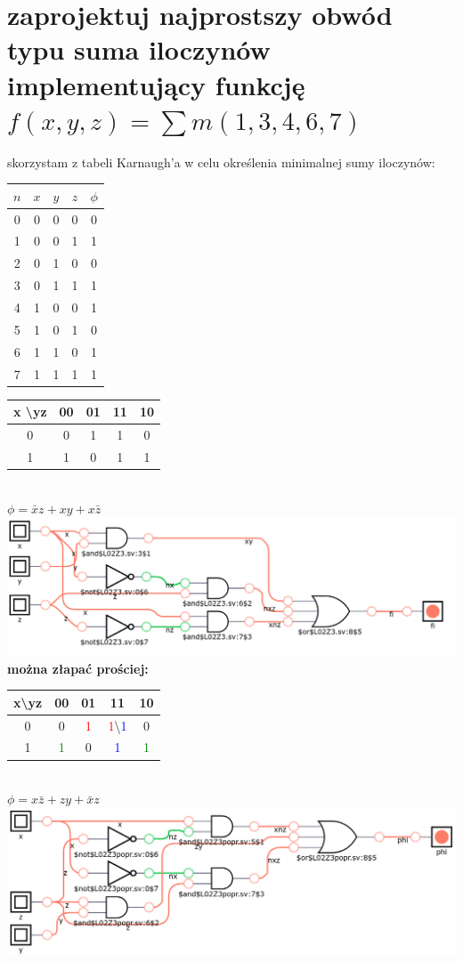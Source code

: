 \documentclass{article}
\begin{document}
 \section{zaprojektuj najprostszy obwód typu suma iloczynów implementujący funkcję $f (x, y, z) = \sum m(1, 3, 4, 6, 7)$}
 skorzystam z tabeli Karnaugh'a w celu określenia minimalnej sumy iloczynów:
 \begin{center}
	\begin{tabular}{|c||c|c|c||c|} 
	 \hline
	$n$ & $x$ & $y$ & $z$ & $\phi$\\ 
	 \hline \hline
	 0&0&0&0&0\\ \hline
	 1&0&0&1&1\\ \hline
	 2&0&1&0&0\\ \hline
	 3&0&1&1&1\\ \hline
	 4&1&0&0&1\\ \hline	 
	 5&1&0&1&0\\ \hline
	 6&1&1&0&1\\ \hline
	 7&1&1&1&1\\ \hline
	\end{tabular}
	\begin{tabular}{|c|c|c|c|c|} 
	 \hline
	x \textbackslash yz& 00 & 01 & 11 & 10\\ 
	 \hline
	 0&0&1&1&0\\ \hline
	 1&1&0&1&1\\ \hline
	\end{tabular}\\
	$\phi = \bar x z + xy + x \bar z$\\
	\includegraphics[scale=0.3]{./L02Z03.png}
	\textbf{można złapać prościej:}
	\begin{tabular}{|c|c|c|c|c|} 
	 \hline
	x\textbackslash yz& 00 & 01 & 11 & 10\\ 
	 \hline
	 0&0&\textcolor{red}1&\textcolor{red}1\textbackslash \textcolor{blue}1&0\\ \hline
	 1&\textcolor{green}1&0&\textcolor{blue}1&\textcolor{green}1\\ \hline
	\end{tabular}\\
	$\phi = x\bar{z} + zy + \bar{x}z$\\
		\includegraphics[scale=0.3]{./L02Z03popr.png}
\end{center}
\end{document}
